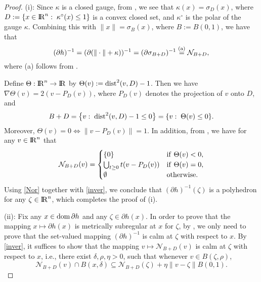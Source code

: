 \documentclass[10pt]{article}
\numberwithin{equation}{section}
\def\R{{\rm I\!R}}
\def\d{{\rm dist}}
\def\dom{{\rm dom}\,}
\begin{document}
\begin{proof}
(i): Since $\kappa$ is a closed gauge, from \cite[Proposition~2.1(iii)]{FrMP14}, we see that $\kappa(x) = \sigma_{D}(x)$, where $D := \{x\in\R^n:\;\kappa^\circ(x) \leq 1\}$ is a convex closed set, and $\kappa^\circ$ is the polar of the gauge $\kappa$. Combining this with $\|x\| = \sigma_{B}(x)$, where $B:= B(0,1)$, we have that
\begin{equation}\label{inver}
(\partial h)^{-1} =(\partial(\|\cdot\| + \kappa))^{-1} = (\partial\sigma_{B + D})^{-1} \overset{\rm (a)}= \mathcal{N}_{B + D},
\end{equation}
where (a) follows from \cite[Eq.~11(4)]{RoWe98}.

Define $\Theta: \R^{n}\to \R$ by $\Theta(v) := \d^2(v,D) - 1$. Then we have $\nabla\Theta(v) = 2(v - P_D(v))$, where $P_D(v)$ denotes the projection of $v$ onto $D$, and
\[
B + D = \left\{v :\; \d^2(v,D) - 1 \leq 0\right\} = \{v :\; \Theta(v) \le 0 \}.
\]
Moreover, $\Theta(v) = 0 \Leftrightarrow \|v - P_D(v)\| = 1$. In addition, from \cite[Section~D:~Theorem~1.3.5]{HirLem01}, we have for any $v\in \R^{n}$ that
\begin{equation}\label{Nor}
\mathcal{N}_{B + D}(v) = \begin{cases}
  \{0\} & {\rm if}\ \Theta(v) < 0,\\
  \bigcup_{t \ge 0}t(v - P_D(v)) & {\rm if}\ \Theta(v) = 0,\\
  \emptyset & {\rm otherwise}.
\end{cases}
\end{equation}
Using \eqref{Nor} together with \eqref{inver}, we conclude that $(\partial h)^{-1}(\zeta)$ is a polyhedron for any $\zeta\in\R^n$, which completes the proof of (i).

(ii): Fix any $x\in\dom \partial h$ and any $\zeta\in \partial h(x)$. In order to prove that the mapping $x\mapsto \partial h(x)$ is metrically subregular at $x$ for $\zeta$, by \cite[Theorem~3H.3]{DonRo09}, we only need to prove that the set-valued mapping $(\partial h)^{-1}$ is calm at $\zeta$ with respect to $x$. By \eqref{inver}, it suffices to show that the mapping $v\mapsto \mathcal{N}_{B + D}(v)$ is calm at $\zeta$ with respect to $x$, i.e., there exist $\delta,\rho,\eta > 0$, such that
whenever $v\in B(\zeta,\rho)$,
\begin{equation}\label{calm}
\mathcal{N}_{B + D}(v)\cap B(x, \delta)\subseteq \mathcal{N}_{B + D}(\zeta) + \eta\|v - \zeta\|B(0,1).
\end{equation}


\end{proof}
\end{document}
